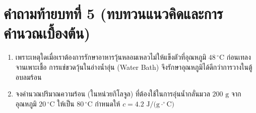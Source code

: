 \section*{คำถามท้ายบทที่ 5 (ทบทวนแนวคิดและการคำนวณเบื้องต้น)}
\begin{enumerate}
    \item เพราะเหตุใดเมื่อเราต้องการรักษาอาหารวุ้นหลอมเหลวไม่ให้แข็งตัวที่อุณหภูมิ $48\,^\circ\text{C}$ ก่อนเทลงจานเพาะเชื้อ การแช่ขวดวุ้นในอ่างน้ำอุ่น (Water Bath) จึงรักษาอุณหภูมิได้ดีกว่าการวางในตู้อบลมร้อน
    \item จงคำนวณปริมาณความร้อน (ในหน่วยกิโลจูล) ที่ต้องใช้ในการอุ่นน้ำกลั่นมวล $200\text{ g}$ จากอุณหภูมิ $20\,^\circ\text{C}$ ให้เป็น $80\,^\circ\text{C}$ กำหนดให้ $c = 4.2\text{ J/(g}\cdot^\circ\text{C)}$
\end{enumerate}
